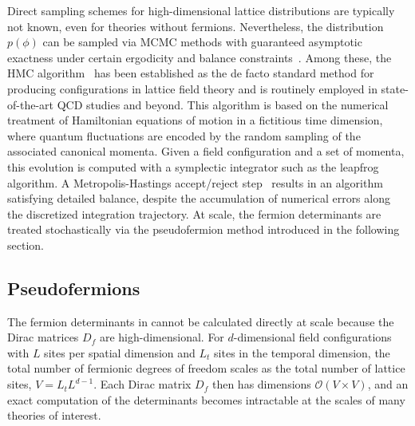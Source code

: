 \documentclass[aps,prd,twocolumn,nofootinbib,superscriptaddress,preprintnumbers]{revtex4-1}
\begin{document}
Direct sampling schemes for high-dimensional lattice distributions are typically not known, even for theories without fermions. Nevertheless, the distribution $p(\phi)$ can be sampled via MCMC methods with guaranteed asymptotic exactness under certain ergodicity and balance constraints~\cite{meyn2012markovErgodicity}. Among these, the HMC algorithm~\cite{DUANE1987216} has been established as the de facto standard method for producing configurations in lattice field theory and is routinely employed in state-of-the-art QCD studies and beyond. This algorithm is based on the numerical treatment of Hamiltonian equations of motion in a fictitious time dimension, where quantum fluctuations are encoded by the random sampling of the associated canonical momenta. Given a field configuration and a set of momenta, this evolution is computed with a symplectic integrator such as the leapfrog algorithm. A Metropolis-Hastings accept/reject step~\cite{Metropolis:1953am,Hastings:1970aa} results in an algorithm satisfying detailed balance, despite the accumulation of numerical errors along the discretized integration trajectory. At scale, the fermion determinants are treated stochastically via the pseudofermion method introduced in the following section.


\subsection{Pseudofermions}
\label{sec:pseudofermions}

The fermion determinants in  cannot be calculated directly at scale because the Dirac matrices $D_f$ are high-dimensional. For $d$-dimensional field configurations with $L$ sites per spatial dimension and $L_t$ sites in the temporal dimension, the total number of fermionic degrees of freedom scales as the total number of lattice sites, $V = L_t L^{d-1}$. Each Dirac matrix $D_f$ then has dimensions $\mathcal{O}(V \times V)$, and an exact computation of the determinants becomes intractable at the scales of many theories of interest.
\end{document}
